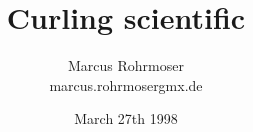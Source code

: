 \documentclass[a4paper,11pt,twoside]{report}
\title{Curling scientific}
\author{Marcus Rohrmoser\\{\small marcus.rohrmoser\symbol{64}gmx.de}}
\date{March 27th 1998}
\begin{document}
\maketitle
\tableofcontents
\listoffigures


\begin{appendix}
\end{appendix}


 \nocite{brach:92}
 \nocite{feynmanI:89}
 \nocite{gammert}
 \nocite{greinerII:85}
 \nocite{gross:95}
 \nocite{hertz:81}
 \nocite{hills:93}
 \nocite{hughesI:76}
 \nocite{hughesII:76}
 \nocite{lehmann:85}
 \nocite{meybergI:93}
 \nocite{van:89}
 \nocite{sutor:88}
 \nocite{denny:98}
 \nocite{shegelski:96}
 \nocite{voyenli:85}
 \nocite{voyenli:86}
 \nocite{daniels:86}
 \nocite{johnston:81}
\end{document}
